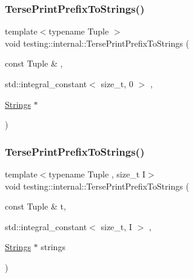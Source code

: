 \mbox{\label{namespacetesting_1_1internal_a6300aa1440d0019cf08d9a1f6efd4382}} 
\subsubsection{\texorpdfstring{TersePrintPrefixToStrings()}{TersePrintPrefixToStrings()}\hspace{0.1cm}{\footnotesize\ttfamily [1/2]}}
{\footnotesize\ttfamily template$<$typename Tuple $>$ \\
void testing\+::internal\+::\+Terse\+Print\+Prefix\+To\+Strings (\begin{DoxyParamCaption}\item[{const Tuple \&}]{,  }\item[{std\+::integral\+\_\+constant$<$ size\+\_\+t, 0 $>$}]{,  }\item[{\mbox{\hyperlink{namespacetesting_1_1internal_a4ad7524c75dfadde584df6d5b4742aa8}{Strings}} $\ast$}]{ }\end{DoxyParamCaption})}

\mbox{\label{namespacetesting_1_1internal_ab244273c02742a3fac45cc241befc536}} 
\subsubsection{\texorpdfstring{TersePrintPrefixToStrings()}{TersePrintPrefixToStrings()}\hspace{0.1cm}{\footnotesize\ttfamily [2/2]}}
{\footnotesize\ttfamily template$<$typename Tuple , size\+\_\+t I$>$ \\
void testing\+::internal\+::\+Terse\+Print\+Prefix\+To\+Strings (\begin{DoxyParamCaption}\item[{const Tuple \&}]{t,  }\item[{std\+::integral\+\_\+constant$<$ size\+\_\+t, I $>$}]{,  }\item[{\mbox{\hyperlink{namespacetesting_1_1internal_a4ad7524c75dfadde584df6d5b4742aa8}{Strings}} $\ast$}]{strings }\end{DoxyParamCaption})}

